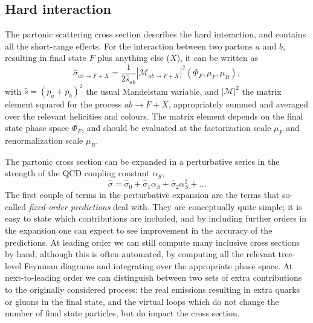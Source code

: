 \subsection{Hard interaction}



The partonic scattering cross section describes the hard interaction, and contains all the
short-range effects. For the interaction between two partons $a$ and $b$, resulting in final state
$F$ plus anything else ($X$), it can be written as
\begin{equation}
  \hat{\sigma}_{ab\rightarrow F+X} = \frac{1}{2\hat{s}_{ab}} | \mathcal{M}_{ab\rightarrow
F+X}|^2(\Phi_F, \mu_F, \mu_R), 
\end{equation}
with $\hat{s} = (p_a + p_b)^2$ the usual Mandelstam variable, and 
$|\mathcal{M}|^2$ the matrix element squared for the process $a b \rightarrow F+X$, appropriately
summed and averaged over the relevant helicities and colours. 
The matrix element depends on the final state phase space $\Phi_F$, and should be evaluated at the
factorization scale $\mu_F$ and renormalization scale $\mu_R$.

The partonic cross section can be expanded in a perturbative series in the strength of the
QCD coupling constant $\alpha_S$, 
\begin{equation}
  \hat{\sigma} = \hat{\sigma}_0 + \hat{\sigma}_1 \alpha_S + \hat{\sigma}_2 \alpha_S^2 + \ldots
\end{equation}
The first couple of terms in the perturbative expansion are the terms that so-called
\textit{fixed-order predictions} deal with. They are conceptually quite simple; it is easy to state
which contributions are included, and by including further orders in the expansion one can expect to
see improvement in the accuracy of the predictions. 
At leading order we can still compute many inclusive cross sections by hand, although this is often
automated, by computing all the relevant tree-level Feynman diagrams and integrating over the
appropriate phase space. 
At next-to-leading order we can distinguish between two sets of extra contributions to the
originally considered process: the real emissions resulting in extra quarks or gluons in the final
state, and the virtual loops which do not change the number of final state particles, but do impact
the cross section. 

